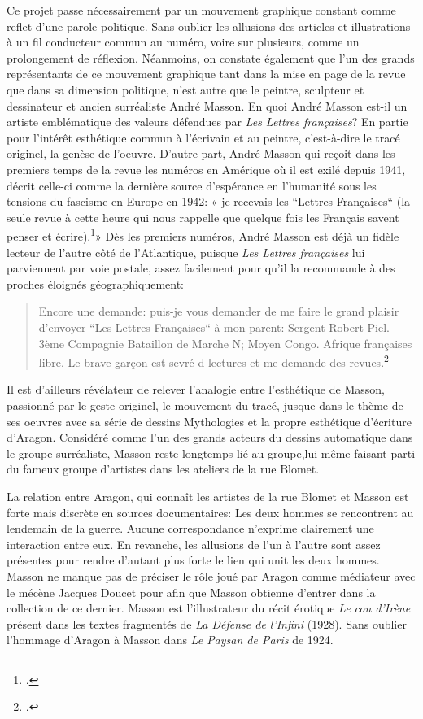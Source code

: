 Ce projet passe nécessairement par un mouvement graphique constant comme reflet d’une parole politique. Sans oublier les allusions des articles et illustrations à un fil conducteur commun au numéro, voire sur plusieurs, comme un prolongement de réflexion. Néanmoins, on constate également que l’un des grands représentants de ce mouvement graphique tant dans la mise en page de la revue que dans sa dimension politique, n’est autre que le peintre, sculpteur et dessinateur et ancien surréaliste André Masson. En quoi André Masson est-il un artiste emblématique des valeurs défendues par \emph{Les Lettres françaises}? En partie pour l’intérêt esthétique commun à l’écrivain et au peintre, c’est-à-dire le tracé originel, la genèse de l’oeuvre. D’autre part, André Masson qui reçoit dans les premiers temps de la revue les numéros en Amérique où il est exilé depuis 1941, décrit celle-ci comme la dernière source d’espérance en l’humanité sous les tensions du fascisme en Europe en 1942: « je recevais les “Lettres Françaises“ (la seule revue à cette heure qui nous rappelle que quelque fois les Français savent penser et écrire).\footcite[]{anneessurrealistes}» Dès les premiers numéros, André Masson est déjà un fidèle lecteur de l’autre côté de l’Atlantique, puisque \emph{Les Lettres françaises} lui parviennent par voie postale, assez facilement pour qu’il la recommande à des proches éloignés géographiquement: 
\begin{quote}
Encore une demande: puis-je vous demander de me faire le grand plaisir d’envoyer “Les Lettres Françaises“ à mon parent: Sergent Robert Piel. 3ème Compagnie Bataillon de Marche N; Moyen Congo. Afrique françaises libre.  Le brave garçon est sevré d lectures et me demande des revues.\footcite[]{anneessurrealistes}
\end{quote}
Il est d’ailleurs révélateur de relever l’analogie entre l’esthétique de Masson, passionné par le geste originel, le mouvement du tracé, jusque dans le thème de ses oeuvres avec sa série de dessins Mythologies et la propre esthétique d’écriture d’Aragon. Considéré comme l’un des grands acteurs du dessins automatique dans le groupe surréaliste, Masson reste longtemps lié au groupe,lui-même faisant parti du fameux groupe d’artistes dans les ateliers de la rue Blomet. 

La relation entre Aragon, qui connaît les artistes de la rue Blomet et Masson est forte mais discrète en sources documentaires: Les deux hommes se rencontrent au lendemain de la guerre. Aucune correspondance n’exprime clairement une interaction entre eux. En revanche, les allusions de l’un à l’autre sont assez présentes pour rendre d’autant plus forte le lien qui unit les deux hommes. Masson ne manque pas de préciser le rôle joué par Aragon comme médiateur avec le mécène Jacques Doucet pour afin que Masson obtienne d’entrer dans la collection de ce dernier. Masson est l’illustrateur du récit érotique \emph{Le con d'Irène} présent dans les textes fragmentés de \emph{La Défense de l’Infini} (1928). Sans oublier l’hommage d’Aragon à Masson dans \emph{Le Paysan de Paris} de 1924. 

